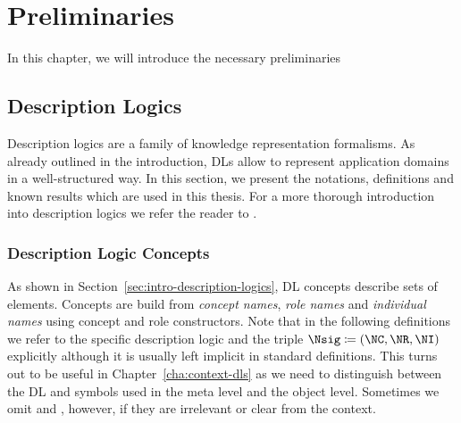 
\chapter{Preliminaries}
\label{cha:preliminaries}

In this chapter, we will introduce the necessary preliminaries


\section{Description Logics}
\label{sec:preliminaries}

Description logics are a family of knowledge representation formalisms. As already outlined in the
introduction, DLs allow to represent application domains in a well-structured way. In this section,
we present the notations, definitions and known results which are used in this thesis.
%
For a more thorough introduction into description logics we refer the reader to
\cite{DLhandbook-07}.

\subsection{Description Logic Concepts}
\label{sec:dl-concepts}

As shown in Section~\ref{sec:intro-description-logics}, DL concepts describe sets of
elements. Concepts are build from \emph{concept names}, \emph{role names} and \emph{individual
  names} using concept and role constructors.  Note that in the following definitions we refer to
the specific description logic \Lmc and the triple $\Nsig \coloneqq (\NC, \NR, \NI)$ explicitly
although it is usually left implicit in standard definitions.  This turns out to be useful in
Chapter~\ref{cha:context-dls} as we need to distinguish between the DL and symbols used in the meta
level and the object level.  Sometimes we omit \Lmc and \Nsig, however, if they are irrelevant or
clear from the context.

